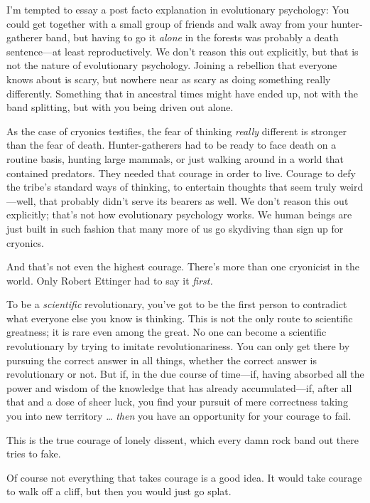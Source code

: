 {
 I'm tempted to essay a post facto explanation in
evolutionary psychology: You could get together with a small group of
friends and walk away from your hunter-gatherer band, but having to go
it \textit{alone} in the forests was probably a death sentence---at
least reproductively. We don't reason this out
explicitly, but that is not the nature of evolutionary psychology.
Joining a rebellion that everyone knows about is scary, but nowhere
near as scary as doing something really differently. Something that in
ancestral times might have ended up, not with the band splitting, but
with you being driven out alone.}

{
 As the case of cryonics testifies, the fear of thinking
\textit{really} different is stronger than the fear of death.
Hunter-gatherers had to be ready to face death on a routine basis,
hunting large mammals, or just walking around in a world that contained
predators. They needed that courage in order to live. Courage to defy
the tribe's standard ways of thinking, to entertain
thoughts that seem truly weird---well, that probably
didn't serve its bearers as well. We
don't reason this out explicitly;
that's not how evolutionary psychology works. We human
beings are just built in such fashion that many more of us go skydiving
than sign up for cryonics.}

{
 And that's not even the highest courage.
There's more than one cryonicist in the world. Only
Robert Ettinger had to say it \textit{first.}}

{
 To be a \textit{scientific} revolutionary, you've
got to be the first person to contradict what everyone else you know is
thinking. This is not the only route to scientific greatness; it is
rare even among the great. No one can become a scientific revolutionary
by trying to imitate revolutionariness. You can only get there by
pursuing the correct answer in all things, whether the correct answer
is revolutionary or not. But if, in the due course of time---if, having
absorbed all the power and wisdom of the knowledge that has already
accumulated---if, after all that and a dose of sheer luck, you find
your pursuit of mere correctness taking you into new territory \ldots
\textit{then} you have an opportunity for your courage to fail.}

{
 This is the true courage of lonely dissent, which every damn rock
band out there tries to fake.}

{
 Of course not everything that takes courage is a good idea. It
would take courage to walk off a cliff, but then you would just go
splat.}

